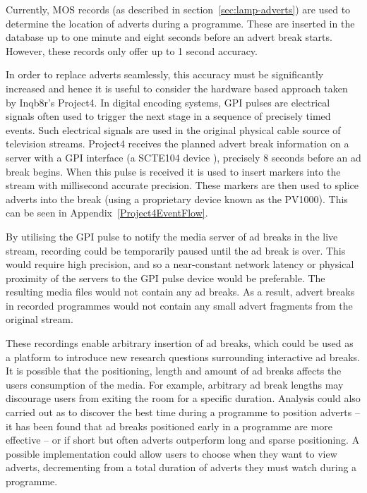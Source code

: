 	Currently, MOS records (as described in section~\ref{sec:lamp-adverts}) are used to determine the location of adverts during a programme. These are inserted in the database up to one minute and eight seconds before an advert break starts. However, these records only offer up to 1 second accuracy.

	In order to replace adverts seamlessly, this accuracy must be significantly increased and hence it is useful to consider the hardware based approach taken by Inqb8r's Project4. In digital encoding systems, GPI pulses are electrical signals often used to trigger the next stage in a sequence of precisely timed events. Such electrical signals are used in the original physical cable source of television streams. Project4 receives the planned advert break information on a server with a GPI interface (a SCTE104 device \citep{SCTE104}), precisely 8 seconds before an ad break begins. When this pulse is received it is used to insert markers into the stream with millisecond accurate precision. These markers are then used to splice adverts into the break (using a proprietary device known as the PV1000). This can be seen in Appendix~\ref{Project4EventFlow}.

	By utilising the GPI pulse to notify the media server of ad breaks in the live stream, recording could be temporarily paused until the ad break is over. This would require high precision, and so a near-constant network latency or physical proximity of the servers to the GPI pulse device would be preferable. The resulting media files would not contain any ad breaks. As a result, advert breaks in recorded programmes would not contain any small advert fragments from the original stream.

	These recordings enable arbitrary insertion of ad breaks, which could be used as a platform to introduce new research questions surrounding interactive ad breaks. It is possible that the positioning, length and amount of ad breaks affects the users consumption of the media. For example, arbitrary ad break lengths may discourage users from exiting the room for a specific duration. Analysis could also carried out as to discover the best time during a programme to position adverts -- it has been found that ad breaks positioned early in a programme are more effective \citep{jeong2011position} -- or if short but often adverts outperform long and sparse positioning. A possible implementation could allow users to choose when they want to view adverts, decrementing from a total duration of adverts they must watch during a programme.

